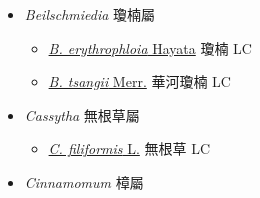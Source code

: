
  \begin{itemize}
 \item[] \textit{Beilschmiedia} 瓊楠屬
                    
  \begin{itemize}
        \item[] \href{http://www.theplantlist.org/tpl1.1/search?q=Beilschmiedia+erythrophloia}{\textit{B. erythrophloia} Hayata}   瓊楠 LC
        \item[] \href{http://www.theplantlist.org/tpl1.1/search?q=Beilschmiedia+tsangii}{\textit{B. tsangii} Merr.}   華河瓊楠 LC
  \end{itemize}
 \item[] \textit{Cassytha} 無根草屬
                    
  \begin{itemize}
        \item[] \href{http://www.theplantlist.org/tpl1.1/search?q=Cassytha+filiformis}{\textit{C. filiformis} L.}   無根草 LC
  \end{itemize}
 \item[] \textit{Cinnamomum} 樟屬
                    

\end{itemize}
